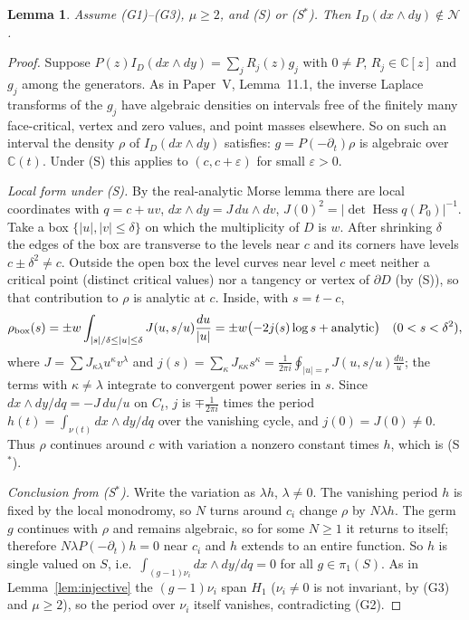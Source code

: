 \documentclass[11pt]{article}
\numberwithin{equation}{section}
\newtheorem{lemma}[theorem]{Lemma}
\theoremstyle{definition}
\theoremstyle{remark}
\newcommand{\C}{\mathbb C}\newcommand{\Q}{\mathbb Q}\newcommand{\R}{\mathbb R}\newcommand{\Z}{\mathbb Z}
\newcommand{\Ncal}{\mathcal N}\newcommand{\Tcal}{\mathcal T}\newcommand{\Bcal}{\mathcal B}
\begin{document}
\begin{lemma}\label{lem:saddle}
Assume \textup{(G1)--(G3)}, $\mu\ge2$, and \textup{(S)} or \textup{(S$^*$)}. Then
$I_D(dx\wedge dy)\notin\Ncal$.
\end{lemma}
\begin{proof}
Suppose $P(z)I_D(dx\wedge dy)=\sum_jR_j(z)g_j$ with $0\ne P$, $R_j\in\C[z]$ and
$g_j$ among the generators. As in Paper~V, Lemma~11.1, the inverse Laplace
transforms of the $g_j$ have algebraic densities on intervals free of the
finitely many face-critical, vertex and zero values, and point masses elsewhere.
So on such an interval the density $\rho$ of $I_D(dx\wedge dy)$ satisfies:
$g=P(-\partial_t)\rho$ is algebraic over $\C(t)$. Under (S) this applies to
$(c,c+\varepsilon)$ for small $\varepsilon>0$.

\emph{Local form under (S).} By the real-analytic Morse lemma there are local
coordinates with $q=c+uv$, $dx\wedge dy=J\,du\wedge dv$,
$J(0)^2=|\det\operatorname{Hess}q(P_0)|^{-1}$. Take a box
$\{|u|,|v|\le\delta\}$ on which the multiplicity of $D$ is $w$. After shrinking $\delta$ the edges of the box are transverse to the levels near
$c$ and its corners have levels $c\pm\delta^2\ne c$. Outside the open
box the level curves near level $c$ meet neither a critical point (distinct
critical values) nor a tangency or vertex of $\partial D$ (by (S)), so that
contribution to $\rho$ is analytic at $c$. Inside, with $s=t-c$,
\[
 \rho_{\rm box}(s)=\pm w\int_{|s|/\delta\le|u|\le\delta}J(u,s/u)\frac{du}{|u|}
 =\pm w\bigl(-2j(s)\log s+\text{analytic}\bigr)\quad(0<s<\delta^2),
\]
where $J=\sum J_{\kappa\lambda}u^\kappa v^\lambda$ and $j(s)=\sum_\kappa J_{\kappa\kappa}s^\kappa
=\frac1{2\pi i}\oint_{|u|=r}J(u,s/u)\frac{du}u$; the terms with
$\kappa\ne\lambda$ integrate to convergent power series in $s$. Since
$dx\wedge dy/dq=-J\,du/u$ on $C_t$, $j$ is $\mp\frac1{2\pi i}$ times the period
$h(t)=\int_{\nu(t)}dx\wedge dy/dq$ over the vanishing cycle, and $j(0)=J(0)\ne0$.
Thus $\rho$ continues around $c$ with variation a nonzero constant times $h$,
which is (S$^*$).

\emph{Conclusion from (S$^*$).} Write the variation as $\lambda h$, $\lambda\ne0$. The
vanishing period $h$ is fixed by the local monodromy, so $N$ turns around
$c_i$ change $\rho$ by $N\lambda h$. The germ $g$ continues with $\rho$ and
remains algebraic, so for some $N\ge1$ it returns to itself; therefore
$N\lambda P(-\partial_t)h=0$ near $c_i$ and $h$ extends to an entire function. So $h$ is
single valued on $S$, i.e.\ $\int_{(g-1)\nu_i}dx\wedge dy/dq=0$ for all
$g\in\pi_1(S)$. As in Lemma~\ref{lem:injective} the $(g-1)\nu_i$ span $H_1$
($\nu_i\ne0$ is not invariant, by (G3) and $\mu\ge2$), so the period over $\nu_i$
itself vanishes, contradicting (G2).
\end{proof}
\end{document}
